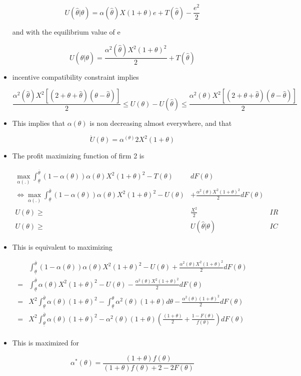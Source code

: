\documentclass[a4paper]{article}
\renewcommand{\t}{\theta}
\renewcommand{\a}{\alpha}
\begin{document}
\begin{itemize}
    $$U(\hat \t|\t)=\a(\hat \t) X(1+\t)e+T(\hat \t)-\frac{e^2}{2}$$
    
    and with the equilibrium value of e
    
    $$U(\hat \t|\t)=\frac{\a^2(\hat \t) X^2(1+\t)^2}{2}+ T(\hat \t)$$
    
    \item incentive compatibility constraint implies  
    
    $$\frac{\a^2(\hat \t) X^2[(2+\t+\hat \t)(\t - \hat \t)]}{2}\leq U(\t)-U(\hat \t)\leq \frac{\a^2(\t) X^2[(2+\t+\hat \t)(\t - \hat \t)]}{2}$$
    \item This implies that $\a(\t)$ is non decreasing almost everywhere, and that 
    
    $$\dot U(\t)=\a^(\t)2 X^2(1+\t)$$
    
    \item The profit maximizing function of firm 2 is 
    
    \begin{equation}
        \begin{aligned}
       \max_{\a(.)}\int_{\underline \t}^{\overline \t}(1-\a(\t))\a(\t) X^2(1+\t)^2-T(\t)& dF(\t)&\\
       \iff \max_{\a(.)}\int_{\underline \t}^{\overline \t}(1-\a(\t))\a(\t) X^2(1+\t)^2-U(\t)&+\frac{\a^2(\t) X^2(1+\t)^2}{2} dF(\t)&\\
       U(\t)\geq& \frac{X^2}{2}&IR\\
       U(\t)\geq& U(\hat \t|\t)&IC
    \end{aligned}
    \end{equation}
    \item This is equivalent to maximizing

\begin{equation}
    \begin{aligned}
       &\int_{\underline \t}^{\overline \t}(1-\a(\t))\a(\t) X^2(1+\t)^2-U(\t)+\frac{\a^2(\t) X^2(1+\t)^2}{2} dF(\t)\\
       =&\int_{\underline \t}^{\overline \t}\a(\t) X^2(1+\t)^2-U(\t)-\frac{\a^2(\t) X^2(1+\t)^2}{2} dF(\t)\\
       =&X^2\int_{\underline \t}^{\overline \t}\a(\t) (1+\t)^2-\int_{\underline \t}^{\t}\a^2(\t)(1+\t)d\t-\frac{\a^2(\t) (1+\t)^2}{2} dF(\t)\\
       =&X^2\int_{\underline \t}^{\overline \t}\a(\t) (1+\t)^2-\a^2(\t)(1+\t)\left(\frac{(1+\t)}{2}+\frac{1-F(\t)}{f(\t)}\right) dF(\t)\\
\end{aligned}
\end{equation}
    \item This is maximized for 
    
    $$\a^*(\t)=\frac{(1+\t)f(\t)}{(1+\t)f(\t)+2-2F(\t)}$$
\end{itemize}
\end{document}
